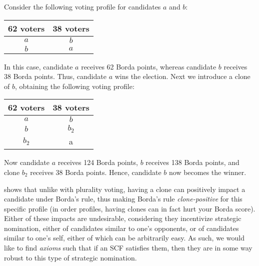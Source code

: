 \begin{example}\label{ex:borda}
    Consider the following voting profile for candidates $a$ and $b$:

\begin{center} 
 \begin{tabular}{|c|c|}
  \hline
  62 voters & 38 voters\\ \hline 
  \cellcolor{yellow!25} $a$ & \cellcolor{blue!25} $b$  \\
  \hline
   \cellcolor{blue!25} $b$ & \cellcolor{yellow!25} $a$ \\
  \hline
\end{tabular}
\end{center}

In this case, candidate $a$ receives 62 Borda points, whereas candidate $b$ receives 38 Borda points. Thus, candidate $a$ wins the election. Next we introduce a clone of $b$, obtaining the following voting profile:


\begin{center} 
 \begin{tabular}{|c|c|}
  \hline
  62 voters & 38 voters\\ \hline 
  \cellcolor{yellow!25} $a$ & \cellcolor{blue!25} $b$  \\
  \hline
   \cellcolor{blue!25} $b$ & \cellcolor{blue!35} $b_2$ \\
  \hline
  \cellcolor{blue!35} $b_2$ & \cellcolor{yellow!25} a \\
  \hline
\end{tabular}
\end{center}

Now candidate $a$ receives 124 Borda points, $b$ receives 138 Borda points, and clone $b_2$ receives 38 Borda points. Hence, candidate $b$ now becomes the winner. 
\end{example}

 shows that unlike with plurality voting, having a clone can positively impact a candidate under Borda's rule, thus making Borda's rule \textit{clone-positive} for this specific profile (in order profiles, having clones can in fact hurt your Borda score). Either of these impacts are undesirable, considering they incentivize strategic nomination, either of candidates similar to one's opponents, or of candidates similar to one's self, either of which can be arbitrarily easy. As such, we would like to find \textit{axioms} such that if an SCF satisfies them, then they are in some way robust to this type of strategic nomination.  

